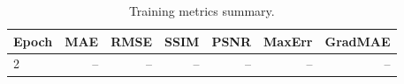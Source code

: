 \begin{table}[htbp]
  \centering
  \caption{Training metrics summary.}
  \label{tab:metrics}
  \begin{tabular}{lrrrrrr}
    \toprule
    Epoch & MAE & RMSE & SSIM & PSNR & MaxErr & GradMAE \\
    \midrule
    2 & -- & -- & -- & -- & -- & -- \\
    \bottomrule
  \end{tabular}
\end{table}
